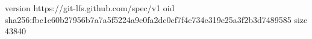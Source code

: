 version https://git-lfs.github.com/spec/v1
oid sha256:fbc1c60b27956b7a7a5f5224a9c0fa2dc0cf7f4c734e319e25a3f2b3d7489585
size 43840
